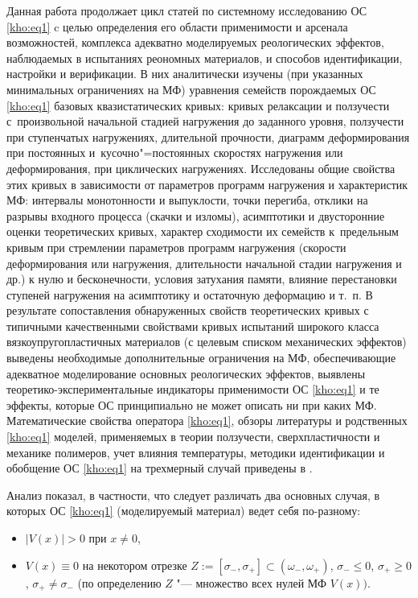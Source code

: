 Данная работа продолжает цикл статей \cite{kho:bib1,kho:bib2,kho:bib3,kho:bib4,kho:bib5,kho:bib6,kho:bib7,kho:bib8} по системному исследованию ОС \eqref{kho:eq1} c целью определения его области применимости и арсенала возможностей, комплекса адекватно моделируемых реологических эффектов, наблюдаемых в испытаниях реономных материалов, и способов идентификации, настройки и верификации. В них аналитически изучены (при указанных минимальных ограничениях на МФ) уравнения семейств порождаемых ОС \eqref{kho:eq1} базовых квазистатических кривых: кривых релаксации и ползучести с~произвольной начальной стадией нагружения до заданного уровня, ползучести при ступенчатых нагружениях, длительной прочности, диаграмм деформирования при постоянных и~кусочно"=постоянных скоростях нагружения или деформирования, при циклических нагружениях. Исследованы общие свойства этих кривых в зависимости от параметров программ нагружения и характеристик МФ: интервалы монотонности и выпуклости, точки перегиба, отклики на разрывы входного процесса (скачки и изломы), асимптотики и двусторонние оценки теоретических кривых, характер сходимости их семейств к~предельным кривым при стремлении параметров программ нагружения (скорости деформирования или нагружения, длительности начальной стадии нагружения и др.) к нулю и бесконечности, условия затухания памяти, влияние перестановки ступеней нагружения на асимптотику и остаточную деформацию и т.~п. В результате сопоставления обнаруженных свойств теоретических кривых с типичными качественными свойствами кривых испытаний широкого класса вязкоупругопластичных материалов (с целевым списком механических эффектов) выведены необходимые дополнительные ограничения на МФ, обеспечивающие адекватное моделирование основных реологических эффектов, выявлены теоретико-экспериментальные индикаторы применимости ОС \eqref{kho:eq1} и те эффекты, которые ОС принципиально не может описать ни при каких МФ. Математические свойства оператора \eqref{kho:eq1}, обзоры литературы и родственных \eqref{kho:eq1} моделей, применяемых в теории ползучести, сверхпластичности и механике полимеров, учет влияния температуры, методики идентификации и обобщение ОС \eqref{kho:eq1} на трехмерный случай приведены в \cite{kho:bib2,kho:bib3,kho:bib4,kho:bib5,kho:bib6,kho:bib7,kho:bib8}. 



Анализ показал, в частности, что следует различать два основных случая, в которых ОС \eqref{kho:eq1} (моделируемый материал) ведет себя по-разному: 

\begin{itemize}



\item[1)] $|V(x)|>0$ при $x\ne0$, 

\item[2)] $V(x)\equiv0$ на некотором отрезке $Z:=[\sigma_{-},\sigma_{+}]\subset(\omega_{-},\omega_{+})$, $\sigma_{-}\le0$, $\sigma_{+}\ge0$, $\sigma_{+}\ne\sigma_{-}$ (по определению $Z$ "--- множество всех нулей МФ $V(x))$. 

\end{itemize}

